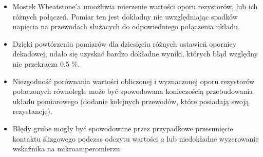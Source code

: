 \documentclass [a4paper,11pt]{article}
\begin{document}
\begin{itemize}
	\item Mostek Wheatstone'a umożliwia mierzenie wartości oporu rezystorów, lub ich różnych połączeń. Pomiar ten jest dokładny nie uwzględniając spadków napięcia na przewodach służacych do odpowiedniego połączenia układu.
	\item Dzięki powtórzeniu pomiarów dla dziesięciu różnych ustawień opornicy dekadowej, udało się uzyskać bardzo dokładne wyniki, których błąd względny nie przekracza 0,5 \%. 
	\item Niezgodność porównania wartości obliczonej i wyznaczonej oporu rezystorów połaczonych równolegle może być spowodowana konieczością przebudowania układu pomiarowego (dodanie kolejnych przewodów, które posiadają swoją rezystancję).
	\item Błędy grube mogły być spowodowane przez przypadkowe przesunięcie kontaktu ślizgowego podczas odczytu wartości $a$ lub niedokładne wyzerowanie wskaźnika na mikroamperomierzu.
\end{itemize}
\end{document}
